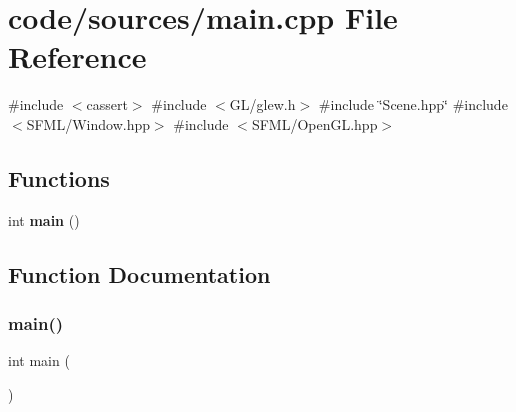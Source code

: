 \section{code/sources/main.cpp File Reference}
\label{main_8cpp}
{\ttfamily \#include $<$cassert$>$}\newline
{\ttfamily \#include $<$G\+L/glew.\+h$>$}\newline
{\ttfamily \#include \char`\"{}Scene.\+hpp\char`\"{}}\newline
{\ttfamily \#include $<$S\+F\+M\+L/\+Window.\+hpp$>$}\newline
{\ttfamily \#include $<$S\+F\+M\+L/\+Open\+G\+L.\+hpp$>$}\newline
\subsection*{Functions}
\begin{DoxyCompactItemize}
\item 
int \textbf{ main} ()
\end{DoxyCompactItemize}


\subsection{Function Documentation}
\mbox{\label{main_8cpp_ae66f6b31b5ad750f1fe042a706a4e3d4}} 
\subsubsection{main()}
{\footnotesize\ttfamily int main (\begin{DoxyParamCaption}{ }\end{DoxyParamCaption})}

